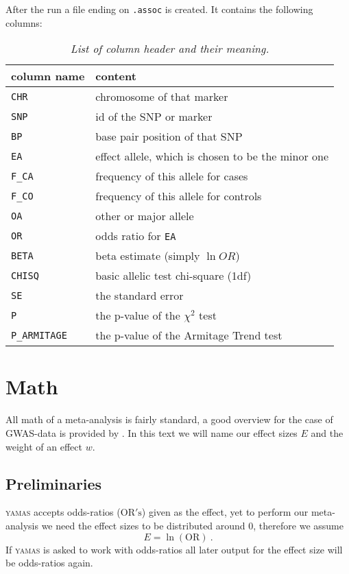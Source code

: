 After the run a file ending on \texttt{.assoc} is created. It contains the following columns:

\begin{table}[H]
 \caption{\emph{List of column header and their meaning.}}
 \centering
\begin{tabular}{ll}
\rowcolor{light-gray}column name & content\\\hline
\verb+CHR+        & chromosome of that marker\\
\verb+SNP+        & id of the SNP or marker\\
\verb+BP+         & base pair position of that SNP\\
\verb+EA+         & effect allele, which is chosen to be the minor one\\
\verb+F_CA+       & frequency of this allele for cases\\
\verb+F_CO+       & frequency of this allele for controls\\
\verb+OA+         & other or major allele\\
\verb+OR+         & odds ratio for \verb+EA+\\
\verb+BETA+       & beta estimate (simply $\ln OR$)\\
\verb+CHISQ+      & basic allelic test chi-square (1df)\\
\verb+SE+         & the standard error\\
\verb+P+          & the p-value of the $\chi^2$ test\\
\verb+P_ARMITAGE+ & the p-value of the Armitage Trend test\\
\end{tabular}
\end{table}

\section{Math}
\label{algo:math}

All math of a meta-analysis is fairly standard, a good overview for the case of GWAS-data is provided by \citet{Bakker2008}. In this text we will name our effect sizes $E$ and the weight of an effect $w$. 

\subsection{Preliminaries}
\label{algo:preliminaries}
\textsc{yamas} accepts odds-ratios ($\mathrm{OR's}$) given as the effect, yet to perform our meta-analysis we need the effect sizes to be distributed around 0, therefore we assume
\begin{equation}
\label{algo:eq:effect}
 E = \ln{(\mathrm{OR})}~.
\end{equation}
If \textsc{yamas} is asked to work with odds-ratios all later output for the effect size will be odds-ratios again.

